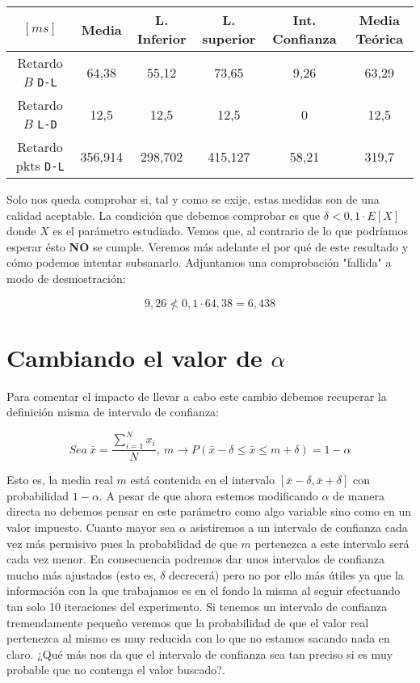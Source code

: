 \documentclass{article}[10pt]
\begin{document}
		\vskip 3mm

		\begin{tabular}{| c | c | c | c | c | c |}
			\hline
			$[ms]$ & Media & L. Inferior & L. superior & Int. Confianza & Media Teórica\\
			\hline
			Retardo $B$ \texttt{D-L} & 64,38 & 55,12 & 73,65 & 9,26 & 63,29\\
			\hline
			Retardo $B$ \texttt{L-D} & 12,5 & 12,5 & 12,5 & 0 & 12,5\\
			\hline
			Retardo pkts \texttt{D-L} & 356,914 & 298,702 & 415,127 & 58,21 & 319,7\\
			\hline
		\end{tabular}

		\vskip 3mm

		Solo nos queda comprobar si, tal y como se exije, estas medidas son de una calidad aceptable. La condición que debemos comprobar es que $\delta < 0,1 \cdot E[X]$ donde $X$ es el parámetro estudiado. Vemos que, al contrario de lo que podríamos esperar ésto \textbf{NO} se cumple. Veremos más adelante el por qué de este resultado y cómo podemos intentar subsanarlo. Adjuntamos una comprobación "fallida" a modo de desmostración:

		$$9,26 \nless 0,1 \cdot 64,38 = 6,438$$

	\section{Cambiando el valor de $\alpha$}
		Para comentar el impacto de llevar a cabo este cambio debemos recuperar la definición misma de intervalo de confianza:

		$$Sea\ \bar{x} = \frac{\sum_{i = 1}^N x_i}{N}, \ m \rightarrow P(\bar{x} - \delta \leq \bar{x} \leq m + \delta) = 1 - \alpha$$

		Esto es, la media real $m$ está contenida en el intervalo $[\bar{x} - \delta, \bar{x} + \delta]$ con probabilidad $1 - \alpha$. A pesar de que ahora estemos modificando $\alpha$ de manera directa no debemos pensar en este parámetro como algo variable sino como en un valor impuesto. Cuanto mayor sea $\alpha$ asistiremos a un intervalo de confianza cada vez más permisivo pues la probabilidad de que $m$ pertenezca a este intervalo será cada vez menor. En consecuencia podremos dar unos intervalos de confianza mucho más ajustados (esto es, $\delta$ decrecerá) pero no por ello más útiles ya que la información con la que trabajamos es en el fondo la misma al seguir efectuando tan solo 10 iteraciones del experimento. Si tenemos un intervalo de confianza tremendamente pequeño veremos que la probabilidad de que el valor real pertenezca al mismo es muy reducida con lo que no estamos sacando nada en claro. ¿Qué más nos da que el intervalo de confianza sea tan preciso si es muy probable que no contenga el valor buscado?.\\
\end{document}

